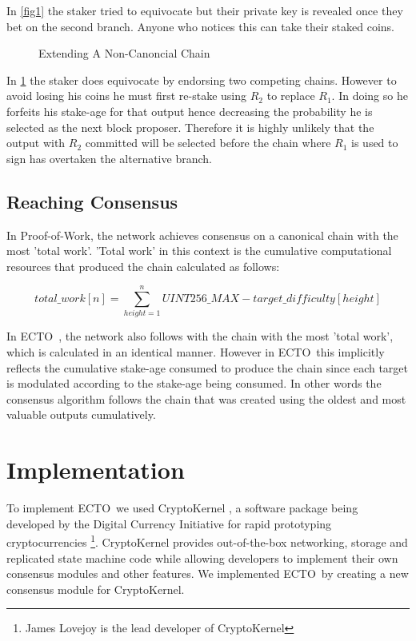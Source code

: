 \documentclass{article}
\newcommand{\coin}{ \textsc{ECTO}\ }
\begin{document}
In \ref{fig1} the staker tried to equivocate but their private key is revealed once they bet on the second branch. Anyone who notices this can take their staked coins.

\begin{figure}[!h]
	\caption{Extending A Non-Canoncial Chain}
	\label{fig2}
	\centering
{}
\end{figure}
 
 In \ref{fig2} the staker does equivocate by endorsing two competing chains. However to avoid losing his coins he must first re-stake using $ R_2 $ to replace $ R_1 $. In doing so he forfeits his stake-age for that output hence decreasing the probability he is selected as the next block proposer. Therefore it is highly unlikely that the output with $ R_2 $ committed will be selected before the chain where $ R_1 $ is used to sign has overtaken the alternative branch.
 
\subsection{Reaching Consensus}
In Proof-of-Work, the network achieves consensus on a canonical chain with the most 'total work'. 'Total work' in this context is the cumulative computational resources that produced the chain calculated as follows:

$$ total\_work[n] = \sum_{height=1}^{n} UINT256\_MAX - target\_difficulty[height] $$

In \coin, the network also follows with the chain with the most 'total work', which is calculated in an identical manner. However in \coin this implicitly reflects the cumulative stake-age consumed to produce the chain since each target is modulated according to the stake-age being consumed. In other words the consensus algorithm follows the chain that was created using the oldest and most valuable outputs cumulatively.  


\section{Implementation}
To implement \coin we used CryptoKernel \cite{ck}, a software package being developed by the Digital Currency Initiative for rapid prototyping cryptocurrencies \footnote{James Lovejoy is the lead developer of CryptoKernel}. CryptoKernel provides out-of-the-box networking, storage and replicated state machine code while allowing developers to implement their own consensus modules and other features. We implemented \coin by creating a new consensus module for CryptoKernel.
\end{document}
